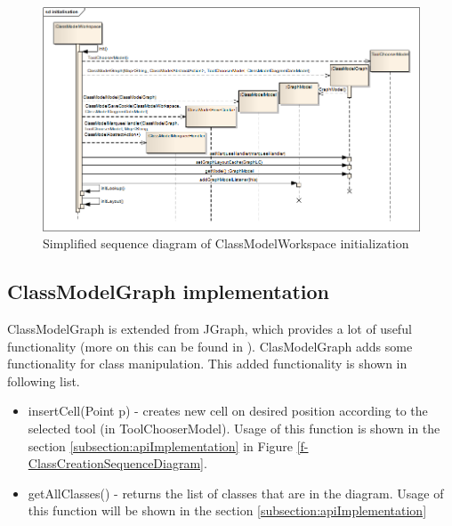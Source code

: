 \begin{figure}[!ht]
\begin{center}
\includegraphics[width=\textwidth]{img/ClassModelWorkspaceInicializationSimple.png}
\caption{Simplified sequence diagram of ClassModelWorkspace initialization}
\label{f-ClassModelWorkspaceInicializationSimple}
\end{center}
\end{figure}

\subsection{ClassModelGraph implementation}

ClassModelGraph is extended from JGraph, which provides a lot of useful functionality (more on this can be found in \cite{jgraphmanual}). ClasModelGraph adds some functionality for class manipulation. This added functionality is shown in following list.
\begin{itemize}
    \item insertCell(Point p) - creates new cell on desired position according to the selected tool (in ToolChooserModel). Usage of this function is shown in the section \ref{subsection:apiImplementation} in Figure \ref{f-ClassCreationSequenceDiagram}.

    \item getAllClasses() - returns the list of classes that are in the diagram. Usage of this function will be shown in the section \ref{subsection:apiImplementation}

\end{itemize} 

